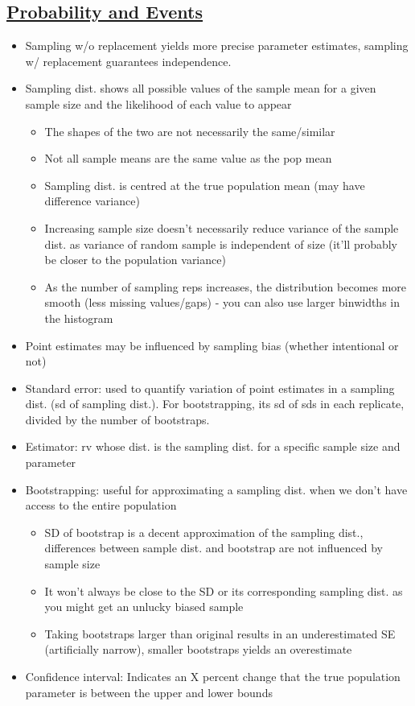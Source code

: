 \documentclass[8pt,landscape,a4paper, fleqn, dvipsnames]{extarticle}
\begin{document}
\begin{multicols*}{4}
\section*{\ul{Probability and Events}}
\begin{itemize}
    \item Sampling w/o replacement yields more precise parameter estimates, sampling w/ replacement guarantees independence.
    \item Sampling dist. shows all possible values of the sample mean for a given sample size and the likelihood of each value to appear
    \begin{itemize}
        \item The shapes of the two are not necessarily the same/similar
        \item Not all sample means are the same value as the pop mean
        \item Sampling dist. is centred at the true population mean (may have difference variance)
        \item Increasing sample size doesn't necessarily reduce variance of the sample dist. as variance of random sample is independent of size (it'll probably be closer to the population variance)
        \item As the number of sampling reps increases, the distribution becomes more smooth (less missing values/gaps) - you can also use larger binwidths in the histogram
    \end{itemize}
    \item Point estimates may be influenced by sampling bias (whether intentional or not)
    \item Standard error: used to quantify variation of point estimates in a sampling dist. (sd of sampling dist.). For bootstrapping, its sd of sds in each replicate, divided by the number of bootstraps.
    \item Estimator: rv whose dist. is the sampling dist. for a specific sample size and parameter
    \item Bootstrapping: useful for approximating a sampling dist. when we don't have access to the entire population
    \begin{itemize}
        \item SD of bootstrap is a decent approximation of the sampling dist., differences between sample dist. and bootstrap are not influenced by sample size
        \item It won't always be close to the SD or its corresponding sampling dist. as you might get an unlucky biased sample
        \item Taking bootstraps larger than original results in an underestimated SE (artificially narrow), smaller bootstraps yields an overestimate
    \end{itemize}
    \item Confidence interval: Indicates an X percent change that the true population parameter is between the upper and lower bounds
    \end{itemize}


\end{multicols*}
\end{document}
